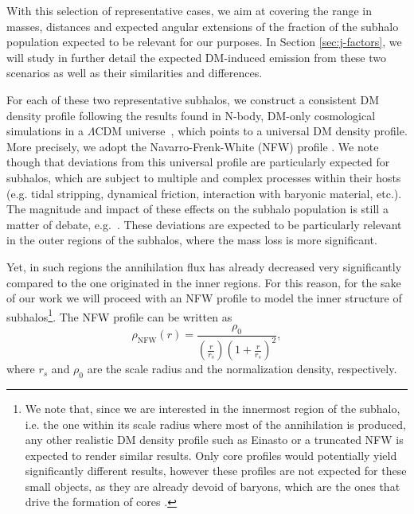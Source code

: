\documentclass[%
 reprint,
nofootinbib,
 amsmath,amssymb,
 aps,
]{revtex4-2}
\begin{document}
With this selection of representative cases, we aim at covering the range in masses, distances and expected angular extensions of the fraction of the subhalo population expected to be relevant for our purposes. In Section \ref{sec:j-factors}, we will study in further detail the expected DM-induced emission from these two scenarios as well as their similarities and differences.

For each of these two representative subhalos, we construct a consistent DM density profile following the results found in N-body, DM-only cosmological simulations in a $\Lambda$CDM universe~\cite{Diemand2008, 2008MNRAS.391.1685S, 2016MNRAS.457.3492H, 2020arXiv200714720I}, which points to a universal DM density profile. More precisely, we adopt the Navarro-Frenk-White (NFW) profile \cite{Navarro1997}. We note though that deviations from this universal profile are particularly expected for subhalos, which are subject to multiple and complex processes within their hosts (e.g. tidal stripping, dynamical friction, interaction with baryonic material, etc.). The magnitude and impact of these effects on the subhalo population is still a matter of debate, e.g.~\cite{stref17,2018MNRAS.474.3043V, 2018MNRAS.475.4066V, 2019MNRAS.485..189O}. These deviations are expected to be particularly relevant in the outer regions of the subhalos, where the mass loss is more significant.

Yet, in such regions the annihilation flux has already decreased very significantly compared to the one originated in the inner regions. For this reason, for the sake of our work we will proceed with an NFW profile to model the inner structure of subhalos\footnote{We note that, since we are interested in the innermost region of the subhalo, i.e. the one within its scale radius where most of the annihilation is produced, any other realistic DM density profile such as Einasto \cite{1965TrAlm...5...87E} or a truncated NFW \cite{Kazantzidis_2004} is expected to render similar results. Only core profiles would potentially yield significantly different results, however these profiles are not expected for these small objects, as they are already devoid of baryons, which are the ones that drive the formation of cores \cite{Pontzen_2012,Cintio_2014}.}. The NFW profile can be written as
\begin{equation}\label{eqn:NFW}
 \rho_{\mathrm{NFW}}(r)=\frac{\rho_0}{\left(\frac{r}{r_s}\right)\left(1+\frac{r}{r_s}\right)^{2}},
\end{equation}
where $r_s$ and $\rho_0$ are the scale radius and the normalization density, respectively.
\end{document}
